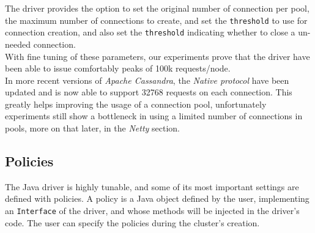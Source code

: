 \documentclass[a4paper]{report}
\newcommand{\ca}{\emph{Apache Cassandra\xspace}}
\begin{document}
The driver provides the option to set the original number of connection per pool, the maximum number of connections to create, and set the \verb;threshold; to use for connection creation, and also set the \verb;threshold; indicating whether to close a un-needed connection.\\
With fine tuning of these parameters, our experiments prove that the driver have been able to issue comfortably peaks of 100k requests/node.\\
In more recent versions of \ca{}, the \emph{Native protocol} have been updated and is now able to support 32768 requests on each connection. This greatly helps improving the usage of a connection pool, unfortunately experiments still show a bottleneck in using a limited number of connections in pools, more on that later, in the \emph{Netty} section.

\subsection{Policies}
The Java driver is highly tunable, and some of its most important settings are defined with policies. A policy is a Java object defined by the user, implementing an \verb;Interface; of the driver, and whose methods will be injected in the driver's code. The user can specify the policies during the cluster's creation.
\end{document}
